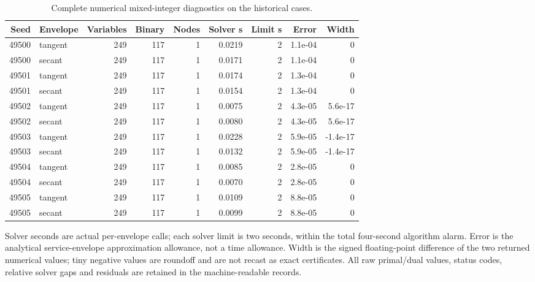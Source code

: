\begin{table}[p]\centering\small\setlength{\tabcolsep}{3pt}
\caption{Complete numerical mixed-integer diagnostics on the historical cases.}\label{tab:mip54}
\begin{tabular}{rlrrrrrrr}\toprule
Seed & Envelope & Variables & Binary & Nodes & Solver s & Limit s & Error & Width\\\midrule
49500 & tangent & 249 & 117 & 1 & 0.0219 & 2 & 1.1e-04 & 0\\
49500 & secant & 249 & 117 & 1 & 0.0171 & 2 & 1.1e-04 & 0\\
49501 & tangent & 249 & 117 & 1 & 0.0174 & 2 & 1.3e-04 & 0\\
49501 & secant & 249 & 117 & 1 & 0.0154 & 2 & 1.3e-04 & 0\\
49502 & tangent & 249 & 117 & 1 & 0.0075 & 2 & 4.3e-05 & 5.6e-17\\
49502 & secant & 249 & 117 & 1 & 0.0080 & 2 & 4.3e-05 & 5.6e-17\\
49503 & tangent & 249 & 117 & 1 & 0.0228 & 2 & 5.9e-05 & -1.4e-17\\
49503 & secant & 249 & 117 & 1 & 0.0132 & 2 & 5.9e-05 & -1.4e-17\\
49504 & tangent & 249 & 117 & 1 & 0.0085 & 2 & 2.8e-05 & 0\\
49504 & secant & 249 & 117 & 1 & 0.0070 & 2 & 2.8e-05 & 0\\
49505 & tangent & 249 & 117 & 1 & 0.0109 & 2 & 8.8e-05 & 0\\
49505 & secant & 249 & 117 & 1 & 0.0099 & 2 & 8.8e-05 & 0\\
\bottomrule\end{tabular}
\par\smallskip\begin{minipage}{0.98\textwidth}\small Solver seconds are actual per-envelope calls; each solver limit is two seconds, within the total four-second algorithm alarm. Error is the analytical service-envelope approximation allowance, not a time allowance. Width is the signed floating-point difference of the two returned numerical values; tiny negative values are roundoff and are not recast as exact certificates. All raw primal/dual values, status codes, relative solver gaps and residuals are retained in the machine-readable records.\end{minipage}\end{table}\clearpage
